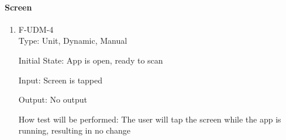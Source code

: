 \documentclass[12pt, titlepage]{article}
\begin{document}
\paragraph{Screen}
\begin{enumerate}
\item{F-UDM-4\\}
Type: Unit, Dynamic, Manual
					
Initial State: 
App is open, ready to scan
					
Input: 
Screen is tapped
					
Output: 
No output
					
How test will be performed: 
The user will  tap the screen while the app is running, resulting in no change

\end{enumerate}
\end{document}
